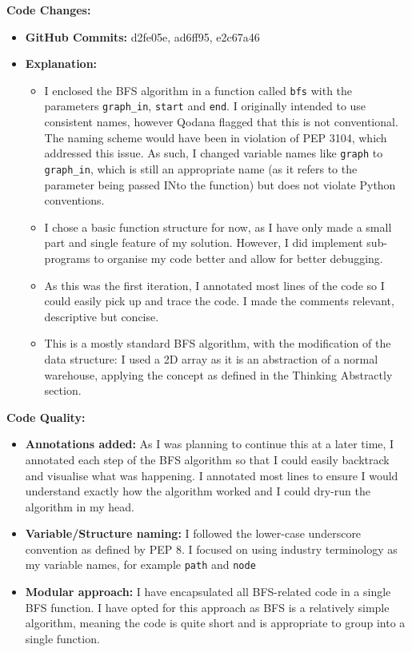 \textbf{Code Changes:}
\begin{itemize}
    \item \textbf{GitHub Commits:} d2fe05e, ad6ff95, e2c67a46
    \item \textbf{Explanation:}
    \begin{itemize}
        \item I enclosed the BFS algorithm in a function called \verb|bfs| with the parameters \verb|graph_in|, \verb|start| and \verb|end|. I originally intended to use consistent names, however Qodana flagged that this is not conventional. The naming scheme would have been in violation of PEP 3104, which addressed this issue. As such, I changed variable names like \verb|graph| to \verb|graph_in|, which is still an appropriate name (as it refers to the parameter being passed INto the function) but does not violate Python conventions.
        \item I chose a basic function structure for now, as I have only made a small part and single feature of my solution. However, I did implement sub-programs to organise my code better and allow for better debugging.
		\item As this was the first iteration, I annotated most lines of the code so I could easily pick up and trace the code. I made the comments relevant, descriptive but concise.
		\item This is a mostly standard BFS algorithm, with the modification of the data structure: I used a 2D array as it is an abstraction of a normal warehouse, applying the concept as defined in the Thinking Abstractly section.
    \end{itemize}
\end{itemize}

\textbf{Code Quality:}
\begin{itemize}
    \item \textbf{Annotations added:} As I was planning to continue this at a later time, I annotated each step of the BFS algorithm so that I could easily backtrack and visualise what was happening. I annotated most lines to ensure I would understand exactly how the algorithm worked and I could dry-run the algorithm in my head.
    \item \textbf{Variable/Structure naming:} I followed the lower-case underscore convention as defined by PEP 8. I focused on using industry terminology as my variable names, for example \verb|path| and \verb|node| 
    \item \textbf{Modular approach:} I have encapsulated all BFS-related code in a single BFS function. I have opted for this approach as BFS is a relatively simple algorithm, meaning the code is quite short and is appropriate to group into a single function.
\end{itemize}

